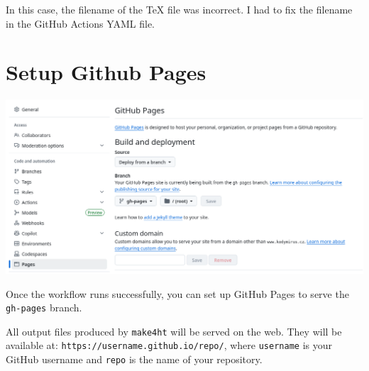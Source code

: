 \documentclass{book}
\begin{document}
In this case, the filename of the TeX file was incorrect. I had to fix the filename in the GitHub Actions YAML file.


\section{Setup Github Pages}
\includegraphics[width=\textwidth]{img/github-pages.png}

Once the workflow runs successfully, you can set up GitHub Pages to serve the \texttt{gh-pages} branch.

All output files produced by \texttt{make4ht} will be served on the web.
They will be available at:
\verb|https://username.github.io/repo/|,
where \texttt{username} is your GitHub username and \texttt{repo} is the name of your repository.
\end{document}
